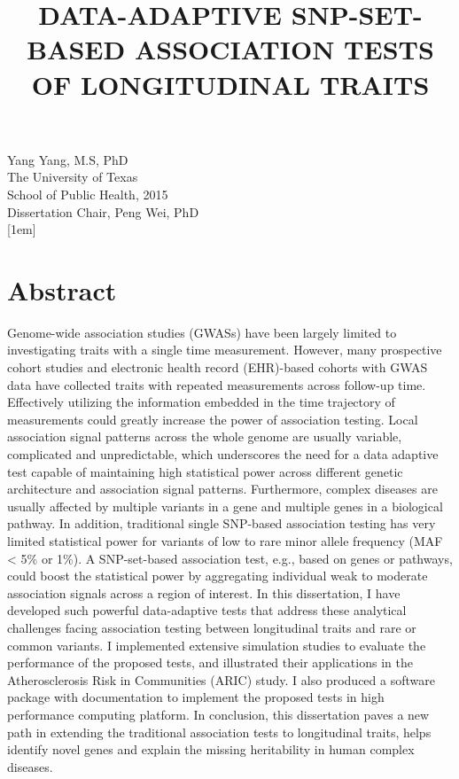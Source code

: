 \documentclass[12pt]{article}
\begin{document}
\newpage
\thispagestyle{empty}
\doublespacing
\begin{titlepage}
\begin{center}
\title{\normalsize DATA-ADAPTIVE SNP-SET-BASED ASSOCIATION TESTS OF LONGITUDINAL TRAITS}
\date{}
\maketitle

\singlespacing
Yang Yang, M.S, PhD\\
The University of Texas\\
School of Public Health, 2015\\
[1em]
Dissertation Chair, Peng Wei, PhD\\
[1em]
\end{center}
\doublespacing
\section*{Abstract}
Genome-wide association studies (GWASs) have been largely limited to investigating traits with a single time measurement. However, many prospective cohort studies and electronic health record (EHR)-based cohorts with GWAS data have collected traits with repeated measurements across follow-up time. Effectively utilizing the information embedded in the time trajectory of measurements could greatly increase the power of association testing. Local association signal patterns across the whole genome are usually variable, complicated and unpredictable, which underscores the need for a data adaptive test capable of maintaining high statistical power across different genetic architecture and association signal patterns. Furthermore, complex diseases are usually affected by multiple variants in a gene and multiple genes in a biological pathway. In addition, traditional single SNP-based association testing has very limited statistical power for variants of low to rare minor allele frequency (MAF < 5\% or 1\%). A SNP-set-based association test, e.g., based on genes or pathways, could boost the statistical power by aggregating individual weak to moderate association signals across a region of interest. In this dissertation, I have developed such powerful data-adaptive tests that address these analytical challenges facing association testing between longitudinal traits and rare or common variants. I implemented extensive simulation studies to evaluate the performance of the proposed tests, and illustrated their applications in the Atherosclerosis Risk in Communities (ARIC) study. I also produced a software package with documentation to implement the proposed tests in high performance computing platform. In conclusion, this dissertation paves a new path in extending the traditional association tests to longitudinal traits, helps identify novel genes and explain the missing heritability in human complex diseases. 
\end{titlepage}
\end{document}
